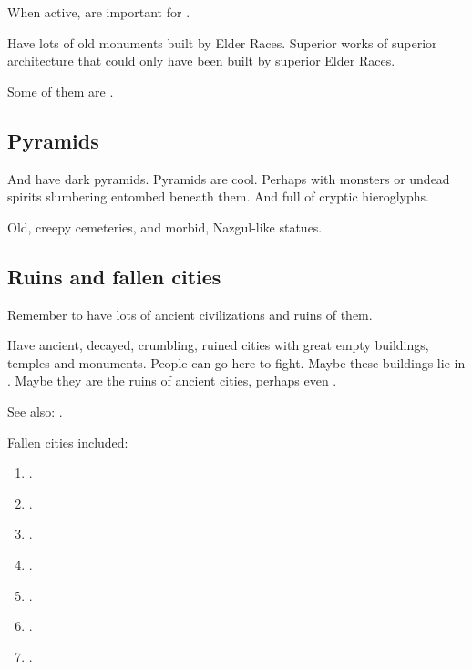 When active,  are important for . 

Have lots of old monuments built by Elder Races. 
Superior works of superior architecture that could only have been built by superior Elder Races.

Some of them are . 










\subsection{Pyramids}
And have dark pyramids. 
Pyramids are cool. 
Perhaps with monsters or undead spirits slumbering entombed beneath them. 
And full of cryptic hieroglyphs. 

Old, creepy cemeteries, and morbid, Nazgul-like statues. 









\subsection{Ruins and fallen cities}
Remember to have lots of ancient civilizations and ruins of them. 

Have ancient, decayed, crumbling, ruined cities with great empty buildings, temples and monuments. 
People can go here to fight. 
Maybe these buildings lie in . 
Maybe they are the ruins of ancient \resphan{} cities, perhaps even \Merkyrah. 

See also: . 

Fallen cities included:
\begin{enumerate}
  \item {}.
  \item {}.
  \item {}.
  \item {}.
  \item {}.
  \item {}.
  \item {}.
\end{enumerate}



